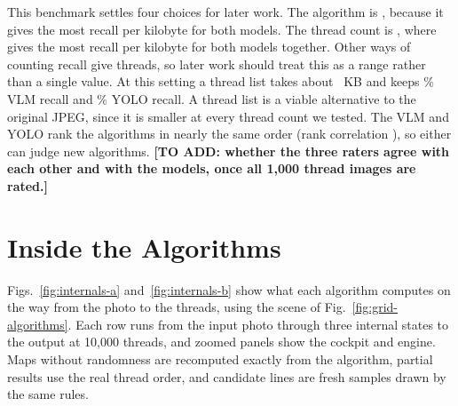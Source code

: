\documentclass[conference]{IEEEtran}
\newcommand{\todo}[1]{\textbf{[TO ADD: #1]}}
\providecommand{\SizeOnlyBest}{}\providecommand{\SizeOnlyBestVlm}{}\providecommand{\SizeOnlyBestYolo}{}\providecommand{\SizeOnlyVlmY}{0}\providecommand{\SizeOnlyYoloY}{0}
\providecommand{\CarryThreads}{}\providecommand{\CarryKB}{}\providecommand{\CarryVlm}{}\providecommand{\CarryYolo}{}
\begin{document}
This benchmark settles four choices for later work. The algorithm is \SizeOnlyBest{}, because it gives the most recall per kilobyte for both models. The thread count is \CarryThreads{}, where \SizeOnlyBest{} gives the most recall per kilobyte for both models together. Other ways of counting recall give \RobustCarries{} threads, so later work should treat this as a range rather than a single value. At this setting a thread list takes about \CarryKB{}~KB and keeps \CarryVlm\% VLM recall and \CarryYolo\% YOLO recall. A thread list is a viable alternative to the original JPEG, since it is smaller at every thread count we tested. The VLM and YOLO rank the algorithms in nearly the same order (rank correlation \RankCorr), so either can judge new algorithms. \todo{whether the three raters agree with each other and with the models, once all 1,000 thread images are rated.}

\appendices
\section{Inside the Algorithms}
\label{app:internals}

Figs.~\ref{fig:internals-a} and~\ref{fig:internals-b} show what each algorithm computes on the way from the photo to the threads, using the scene of Fig.~\ref{fig:grid-algorithms}. Each row runs from the input photo through three internal states to the output at 10,000 threads, and zoomed panels show the cockpit and engine. Maps without randomness are recomputed exactly from the algorithm, partial results use the real thread order, and candidate lines are fresh samples drawn by the same rules.


\end{document}
